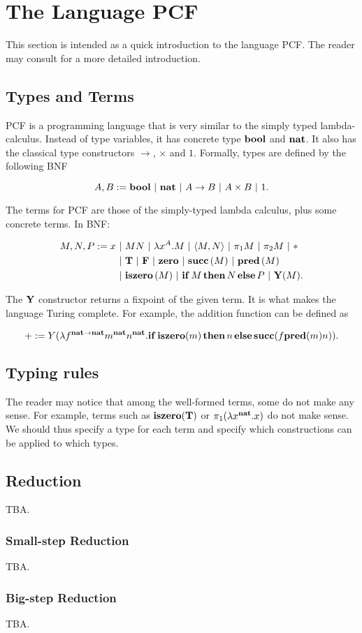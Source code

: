 \section{The Language PCF}

This section is intended as a quick introduction to the language PCF. The reader may consult \cite{LambdaNotes} for a more detailed introduction.

\subsection{Types and Terms}

PCF is a programming language that is very similar to the simply typed lambda-calculus. Instead of type variables, it has concrete type $\mathbf{bool}$ and $\mathbf{nat}$. It also has the classical type constructors $\to$, $\times$ and $1$. Formally, types are defined by the following BNF

\[ A, B := \mathbf{bool} \ \mathbf{|}\  \mathbf{nat} \ \mathbf{|}\  A\to B \ \mathbf{|}\  A\times B \ \mathbf{|}\  1. \]

The terms for PCF are those of the simply-typed lambda calculus, plus some concrete terms. In BNF:

\begin{align*}
    M, N, P := x &\ \mathbf{|}\  MN \ \mathbf{|}\  \lambda x^A.M \ \mathbf{|}\  \langle M, N\rangle \ \mathbf{|}\  \pi_1M \ \mathbf{|}\  \pi_2M \ \mathbf{|}\  * \\
    &\ \mathbf{|}\  \mathbf{T} \ \mathbf{|}\  \mathbf{F} \ \mathbf{|}\  \mathbf{zero} \ \mathbf{|}\  \mathbf{succ}\,(M) \ \mathbf{|}\  \mathbf{pred}\,(M) \\
    &\ \mathbf{|}\  \mathbf{iszero}\,(M) \ \mathbf{|}\  \mathbf{if}\,M\,\mathbf{then}\,N\,\mathbf{else}\,P \ \mathbf{|}\  \mathbf{Y}(M).
\end{align*}

The $\mathbf{Y}$ constructor returns a fixpoint of the given term. It is what makes the language Turing complete. For example, the addition function can be defined as

\[ + := Y(\lambda f^{\mathbf{nat}\to\mathbf{nat}}m^\mathbf{nat}n^\mathbf{nat}.\mathbf{if}\,\mathbf{iszero}(m)\,\mathbf{then}\,n\,\mathbf{else}\,\mathbf{succ}(f \mathbf{pred}(m) n)). \]

\subsection{Typing rules}

The reader may notice that among the well-formed terms, some do not make any sense. For example, terms such as $\mathbf{iszero}(\mathbf{T})$ or $\pi_1(\lambda x^\mathbf{nat}.x)$ do not make sense. We should thus specify a type for each term and specify which constructions can be applied to which types.



\subsection{Reduction}

TBA.

\subsubsection{Small-step Reduction}

TBA.

\subsubsection{Big-step Reduction}

TBA.